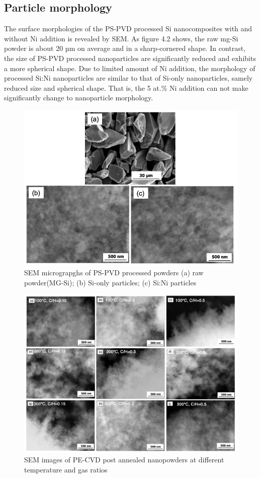 \subsection{Particle morphology}
The surface morphologies of the PS-PVD processed Si nanocomposites with and without Ni addition  is revealed by SEM. As figure 4.2 shows,  the raw mg-Si powder is about 20 µm on average and in a sharp-cornered shape. In contrast, the size of PS-PVD processed nanoparticles are significantly reduced and exhibits a more spherical shape. Due to limited amount of Ni addition, the morphology of processed Si:Ni nanoparticles are similar to that of Si-only nanoparticles, samely reduced size and spherical shape. That is, the 5 at.\% Ni addition can not make significantly change to nanoparticle morphology.
\begin{figure}[h]
\centering
\includegraphics[width=12cm]{src/fig/fig43.png}
\caption{SEM micrograpghs of  PS-PVD processed powders (a) raw powder(MG-Si); (b) Si-only particles; (c) Si:Ni particles}
\end{figure}
\begin{figure}[h]
\centering
\includegraphics[width=12cm]{src/fig/fig44.png}
\caption{SEM images of PE-CVD post annealed nanopowders at different temperature and gas ratios}
\end{figure}


